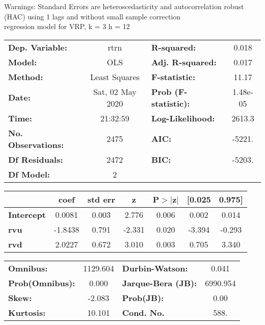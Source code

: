 Warnings: \newline
 [1] Standard Errors are heteroscedasticity and autocorrelation robust (HAC) using 1 lags and without small sample correction\\ 

regression model for VRP, k = 3 h = 12\begin{center}
\begin{tabular}{lclc}
\toprule
\textbf{Dep. Variable:}    &       rtrn       & \textbf{  R-squared:         } &     0.018   \\
\textbf{Model:}            &       OLS        & \textbf{  Adj. R-squared:    } &     0.017   \\
\textbf{Method:}           &  Least Squares   & \textbf{  F-statistic:       } &     11.17   \\
\textbf{Date:}             & Sat, 02 May 2020 & \textbf{  Prob (F-statistic):} &  1.48e-05   \\
\textbf{Time:}             &     21:32:59     & \textbf{  Log-Likelihood:    } &    2613.3   \\
\textbf{No. Observations:} &        2475      & \textbf{  AIC:               } &    -5221.   \\
\textbf{Df Residuals:}     &        2472      & \textbf{  BIC:               } &    -5203.   \\
\textbf{Df Model:}         &           2      & \textbf{                     } &             \\
\bottomrule
\end{tabular}
\begin{tabular}{lcccccc}
                   & \textbf{coef} & \textbf{std err} & \textbf{z} & \textbf{P$> |$z$|$} & \textbf{[0.025} & \textbf{0.975]}  \\
\midrule
\textbf{Intercept} &       0.0081  &        0.003     &     2.776  &         0.006        &        0.002    &        0.014     \\
\textbf{rvu}       &      -1.8438  &        0.791     &    -2.331  &         0.020        &       -3.394    &       -0.293     \\
\textbf{rvd}       &       2.0227  &        0.672     &     3.010  &         0.003        &        0.705    &        3.340     \\
\bottomrule
\end{tabular}
\begin{tabular}{lclc}
\textbf{Omnibus:}       & 1129.604 & \textbf{  Durbin-Watson:     } &    0.041  \\
\textbf{Prob(Omnibus):} &   0.000  & \textbf{  Jarque-Bera (JB):  } & 6990.954  \\
\textbf{Skew:}          &  -2.083  & \textbf{  Prob(JB):          } &     0.00  \\
\textbf{Kurtosis:}      &  10.101  & \textbf{  Cond. No.          } &     588.  \\
\bottomrule
\end{tabular}
\end{center}

